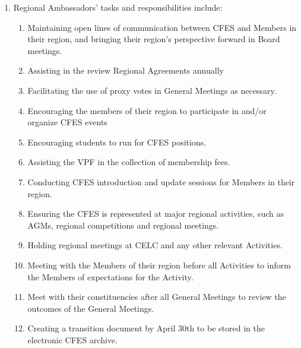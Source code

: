 \begin{enumerate}
 \item Regional Ambassadors’ tasks and responsibilities include:
  \begin{enumerate}
   \item Maintaining open lines of communication between CFES and Members in their region, and bringing their region’s perspective forward in Board meetings.
   \item Assisting in the review Regional Agreements annually
   \item Facilitating the use of proxy votes in General Meetings as necessary.
   \item Encouraging the members of their region to participate in and/or organize CFES events
   \item Encouraging students to run for CFES positions.
   \item Assisting the VPF in the collection of membership fees.
   \item Conducting CFES introduction and update sessions for Members in their region.
   \item Ensuring the CFES is represented at major regional activities, such as AGMs, regional competitions and regional meetings.
   \item Holding regional meetings at CELC and any other relevant Activities.
   \item Meeting with the Members of their region before all Activities to inform the Members of expectations for the Activity.
   \item Meet with their constituencies after all General Meetings to review the outcomes of the General Meetings.
   \item Creating a transition document by April 30th to be stored in the electronic CFES archive.
  \end{enumerate}
\end{enumerate}
